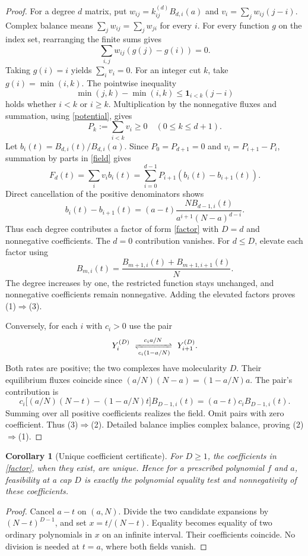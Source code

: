 \documentclass[11pt]{article}
\newtheorem{corollary}[theorem]{Corollary}
\begin{document}
\begin{proof}
For a degree $d$ matrix, put $w_{ij}=k^{(d)}_{ij} B_{d,i}(a)$ and $v_i=\sum_j w_{ij}(j-i)$. Complex balance means $\sum_jw_{ij}=\sum_jw_{ji}$ for every $i$. For every function $g$ on the index set, rearranging the finite sums gives
\begin{equation}\label{potential}
\sum_{i,j} w_{ij}(g(j)-g(i))=0.
\end{equation}
Taking $g(i)=i$ yields $\sum_i v_i=0$. For an integer cut $k$, take $g(i)=\min(i,k)$. The pointwise inequality
\[
\min(j,k)-\min(i,k)\leq \mathbf 1_{i<k}(j-i)
\]
holds whether $i<k$ or $i\geq k$. Multiplication by the nonnegative fluxes and summation, using \eqref{potential}, gives
\begin{equation}\label{prefix}
P_k:=\sum_{i<k}v_i\geq0\quad (0\leq k\leq d+1).
\end{equation}
Let $b_i(t)=B_{d,i}(t)/B_{d,i}(a)$. Since $P_0=P_{d+1}=0$ and $v_i=P_{i+1}-P_i$, summation by parts in \eqref{field} gives
\[
F_d(t)=\sum_i v_i b_i(t)=\sum_{i=0}^{d-1}P_{i+1}(b_i(t)-b_{i+1}(t)).
\]
Direct cancellation of the positive denominators shows
\[
b_i(t)-b_{i+1}(t)
=(a-t)\frac{N B_{d-1,i}(t)}{a^{i+1}(N-a)^{d-i}}.
\]
Thus each degree contributes a factor of form \eqref{factor} with $D=d$ and nonnegative coefficients. The $d=0$ contribution vanishes. For $d\leq D$, elevate each factor using
\begin{equation}\label{elevate}
 B_{m,i}(t)=\frac{B_{m+1,i}(t)+B_{m+1,i+1}(t)}{N}.
\end{equation}
The degree increases by one, the restricted function stays unchanged, and nonnegative coefficients remain nonnegative. Adding the elevated factors proves (1)$\Rightarrow$(3).

Conversely, for each $i$ with $c_i>0$ use the pair
\begin{equation}\label{pair}
Y_i^{(D)}\ \xrightleftharpoons[c_i(1-a/N)]{c_i a/N}\ Y_{i+1}^{(D)}.
\end{equation}
Both rates are positive; the two complexes have molecularity $D$. Their equilibrium fluxes coincide since $(a/N)(N-a)=(1-a/N)a$. The pair's contribution is
\[
 c_i\big[(a/N)(N-t)-(1-a/N)t\big] B_{D-1,i}(t)
 =(a-t)c_iB_{D-1,i}(t).
\]
Summing over all positive coefficients realizes the field. Omit pairs with zero coefficient. Thus (3)$\Rightarrow$(2). Detailed balance implies complex balance, proving (2)$\Rightarrow$(1).
\end{proof}

\begin{corollary}[Unique coefficient certificate]\label{coeff}
For $D\geq1$, the coefficients in \eqref{factor}, when they exist, are unique. Hence for a prescribed polynomial $f$ and $a$, feasibility at a cap $D$ is exactly the polynomial equality test and nonnegativity of these coefficients.
\end{corollary}
\begin{proof}
Cancel $a-t$ on $(a,N)$. Divide the two candidate expansions by $(N-t)^{D-1}$, and set $x=t/(N-t)$. Equality becomes equality of two ordinary polynomials in $x$ on an infinite interval. Their coefficients coincide. No division is needed at $t=a$, where both fields vanish.
\end{proof}
\end{document}

